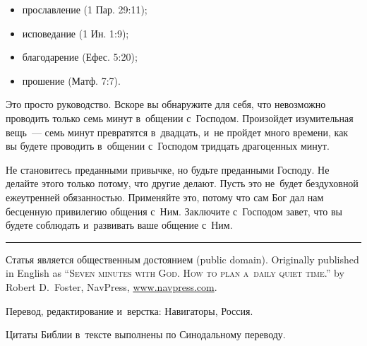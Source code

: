 \documentclass[11pt,article,a4paper,fittopage,oneside]{article}
\begin{document}
\begin{multicols}{2}
\begin{itemize}
\item прославление (1 Пар. 29:11);
\item исповедание (1 Ин. 1:9); 
\item благодарение (Ефес. 5:20);
\item прошение (Матф. 7:7).
\end{itemize}

Это просто руководство. Вскоре вы обнаружите для себя, что невозможно проводить только семь минут в~общении с~Господом. Произойдет изумительная вещь~--- семь минут превратятся в~двадцать, и~не пройдет много времени, как вы будете проводить в~общении с~Господом тридцать драгоценных минут.

Не становитесь преданными привычке, но будьте преданными Господу. Не делайте этого только потому, что другие делают. Пусть это не~будет бездуховной ежеутренней обязанностью. Применяйте это, потому что сам Бог дал нам бесценную привилегию общения с~Ним. Заключите с~Господом завет, что вы будете соблюдать и~развивать ваше общение с~Ним. 

\end{multicols}

\hrule
\begin{footnotesize}
\noindent
\begin{flushleft}
Статья является общественным достоянием (public domain). Originally published in English as  \textsc{``Seven minutes with God. How to plan a~daily quiet time.''} by Robert D.~Foster, NavPress, \href{https://www.navpress.com/}{www.navpress.com}.
\end{flushleft}

\noindent
Перевод, редактирование и~верстка: Навигаторы, Россия.

\noindent
Цитаты Библии в~тексте выполнены по Синодальному переводу.

\end{footnotesize}
\end{document}
